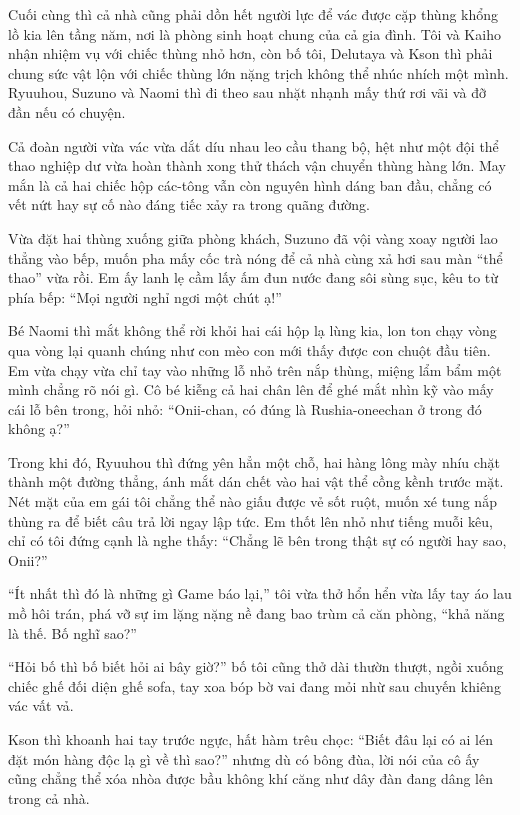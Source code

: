 ﻿\documentclass[../main.tex]{subfiles}
\begin{document}
\ct

Cuối cùng thì cả nhà cũng phải dồn hết người lực để vác được cặp thùng khổng lồ kia lên tầng năm, nơi là phòng sinh hoạt chung của cả gia đình. Tôi và Kaiho nhận nhiệm vụ với chiếc thùng nhỏ hơn, còn bố tôi, Delutaya và Kson thì phải chung sức vật lộn với chiếc thùng lớn nặng trịch không thể nhúc nhích một mình. Ryuuhou, Suzuno và Naomi thì đi theo sau nhặt nhạnh mấy thứ rơi vãi và đỡ đần nếu có chuyện.

Cả đoàn người vừa vác vừa dắt díu nhau leo cầu thang bộ, hệt như một đội thể thao nghiệp dư vừa hoàn thành xong thử thách vận chuyển thùng hàng lớn. May mắn là cả hai chiếc hộp các-tông vẫn còn nguyên hình dáng ban đầu, chẳng có vết nứt hay sự cố nào đáng tiếc xảy ra trong quãng đường.

Vừa đặt hai thùng xuống giữa phòng khách, Suzuno đã vội vàng xoay người lao thẳng vào bếp, muốn pha mấy cốc trà nóng để cả nhà cùng xả hơi sau màn ``thể thao'' vừa rồi. Em ấy lanh lẹ cầm lấy ấm đun nước đang sôi sùng sục, kêu to từ phía bếp: ``Mọi người nghỉ ngơi một chút ạ!''

Bé Naomi thì mắt không thể rời khỏi hai cái hộp lạ lùng kia, lon ton chạy vòng qua vòng lại quanh chúng như con mèo con mới thấy được con chuột đầu tiên. Em vừa chạy vừa chỉ tay vào những lỗ nhỏ trên nắp thùng, miệng lẩm bẩm một mình chẳng rõ nói gì. Cô bé kiễng cả hai chân lên để ghé mắt nhìn kỹ vào mấy cái lỗ bên trong, hỏi nhỏ: ``Onii-chan, có đúng là Rushia-oneechan ở trong đó không ạ?''

Trong khi đó, Ryuuhou thì đứng yên hẳn một chỗ, hai hàng lông mày nhíu chặt thành một đường thẳng, ánh mắt dán chết vào hai vật thể cồng kềnh trước mặt. Nét mặt của em gái tôi chẳng thể nào giấu được vẻ sốt ruột, muốn xé tung nắp thùng ra để biết câu trả lời ngay lập tức. Em thốt lên nhỏ như tiếng muỗi kêu, chỉ có tôi đứng cạnh là nghe thấy: ``Chẳng lẽ bên trong thật sự có người hay sao, Onii?''

``Ít nhất thì đó là những gì Game báo lại,'' tôi vừa thở hổn hển vừa lấy tay áo lau mồ hôi trán, phá vỡ sự im lặng nặng nề đang bao trùm cả căn phòng, ``khả năng là thế. Bố nghĩ sao?''

``Hỏi bố thì bố biết hỏi ai bây giờ?'' bố tôi cũng thở dài thườn thượt, ngồi xuống chiếc ghế đối diện ghế sofa, tay xoa bóp bờ vai đang mỏi nhừ sau chuyến khiêng vác vất vả.

Kson thì khoanh hai tay trước ngực, hất hàm trêu chọc: ``Biết đâu lại có ai lén đặt món hàng độc lạ gì về thì sao?'' nhưng dù có bông đùa, lời nói của cô ấy cũng chẳng thể xóa nhòa được bầu không khí căng như dây đàn đang dâng lên trong cả nhà.
\end{document}
